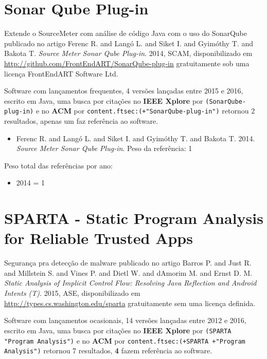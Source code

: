 \section{Sonar Qube Plug-in}

Extende o SourceMeter com análise de código Java com o uso do SonarQube
publicado no artigo
Ferenc R. and Langó L. and Siket I. and Gyimóthy T. and Bakota T.
{\it Source Meter Sonar Qube Plug-in}.
2014,
SCAM,
disponibilizado em \url{http://github.com/FrontEndART/SonarQube-plug-in}
gratuitamente
sob uma licença FrontEndART Software Ltd.

Software com lançamentos frequentes,
4 versões lançadas
entre 2015 e 2016,
escrito em Java,
uma busca por citações no {\bf IEEE Xplore} por
\texttt{(SonarQube-plug-in)}
e no {\bf ACM} por
\texttt{content.ftsec:(+"SonarQube-plug-in")}
retornou
2 resultados,
apenas um faz referência ao software.

\begin{itemize}
\item Ferenc R. and Langó L. and Siket I. and Gyimóthy T. and Bakota T.
      2014.
      {\it Source Meter Sonar Qube Plug-in}.
      Peso da referência: 1
\end{itemize}

Peso total das referências por ano:

\begin{itemize}
\item 2014 = 1
\end{itemize}


\section{SPARTA - Static Program Analysis for Reliable Trusted Apps}

Segurança pra detecção de malware
publicado no artigo
Barros P. and Just R. and Millstein S. and Vines P. and Dietl W. and dAmorim M. and Ernst D. M.
{\it Static Analysis of Implicit Control Flow: Resolving Java Reflection and Android Intents (T)}.
2015,
ASE,
disponibilizado em \url{http://types.cs.washington.edu/sparta}
gratuitamente
sem uma licença definida.

Software com lançamentos ocasionais,
14 versões lançadas
entre 2012 e 2016,
escrito em Java,
uma busca por citações no {\bf IEEE Xplore} por
\texttt{(SPARTA "Program Analysis")}
e no {\bf ACM} por
\texttt{content.ftsec:(+SPARTA +"Program Analysis")}
retornou
7 resultados,
{\bf 4} fazem referência ao software.

